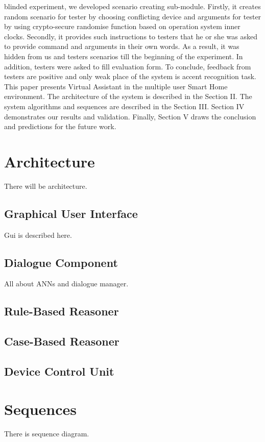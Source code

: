 \documentclass{llncs}
\begin{document}
    blinded experiment, we developed scenario creating sub-module. Firstly, it creates random scenario for tester by choosing
    conflicting device and arguments for tester by using crypto-secure randomise function based on operation system inner
    clocks. Secondly, it provides such instructions to testers that he or she was
    asked to provide command and arguments in their own words. As a result, it was hidden from us and testers scenarios till
    the beginning of the experiment. In addition, testers were asked to fill evaluation form. To conclude, feedback from
    testers are positive and only weak place of the system is accent recognition task.
    \\This paper presents Virtual Assistant in the multiple user Smart Home environment. The architecture of the system is
    described in the Section II. The system algorithms and sequences are described in the Section III. Section IV demonstrates
    our results and validation. Finally, Section V draws the conclusion and predictions for the future work.
    \section{Architecture}
    There will be architecture.
    \subsection{Graphical User Interface}
    Gui is described here.
    \subsection{Dialogue Component}
    All about ANNs and dialogue manager.
    \subsection{Rule-Based Reasoner}
    \subsection{Case-Based Reasoner}
    \subsection{Device Control Unit}
    \section{Sequences}
    There is sequence diagram.
\end{document}
